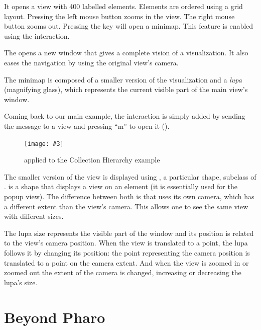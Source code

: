 \documentclass[a4paper,10pt,twoside]{book}
\newcommand{\fig}[4]{
		\begin{figure}[#1]
			\centering
			\texttt{[image: \#3]}
			\caption{\label{fig:#3}#4}
		\end{figure}}
\begin{document}
It opens a view with 400 labelled elements. Elements are ordered using a grid layout. Pressing the left mouse button zooms in the view. The right mouse button zooms out. Pressing the  key will open a minimap. This feature is enabled using the  interaction.

The  opens a new window that gives a complete vision of a visualization. It also eases the navigation by using the original view's camera.

The minimap is composed of a smaller version of the visualization and a \emph{lupa} (magnifying glass), which represents the current visible part of the main view's window. 


Coming back to our main example, the interaction is simply added by sending the  message to a view and pressing ``m'' to open it (). %

\fig{H}{0.9}{miniMap}{ applied to the Collection Hierarchy example}

The smaller version of the view is displayed using , a particular shape, subclass of . 
 is a shape that displays a view on an element (it is essentially used for the popup view). The difference between both is that  uses its own camera, which has a different extent than the view's camera. This allows one to see the same view with different sizes. 

The lupa size represents the visible part of the window and its position is related to the view's camera position. When the view is translated to a point, the lupa follows it by changing its position: the point representing the camera position is translated to a point on the  camera extent. And when the view is zoomed in or zoomed out the extent of the camera is changed, increasing or decreasing the lupa's size.




\section{Beyond Pharo}
\end{document}
